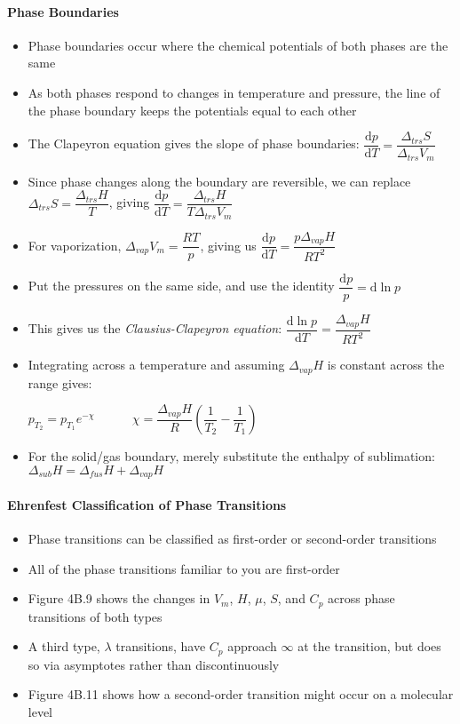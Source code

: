 \documentclass[12pt, openany, letterpaper]{memoir}
\begin{document}
\paragraph{Phase Boundaries}
\begin{itemize}
	\item Phase boundaries occur where the chemical potentials of both phases are the same
	\item As both phases respond to changes in temperature and pressure, the line of the phase boundary keeps the potentials equal to each other
	\item The Clapeyron equation gives the slope of phase boundaries: $\dfrac{\mathrm{d}p}{\mathrm{d}T}=\dfrac{\Delta_{trs}S}{\Delta_{trs}V_m}$
	\item Since phase changes along the boundary are reversible, we can replace $\Delta_{trs}S=\dfrac{\Delta_{trs}H}{T}$, giving $\dfrac{\mathrm{d}p}{\mathrm{d}T}= \dfrac{\Delta_{trs}H}{T\Delta_{trs}V_m}$
	\item For vaporization, $\Delta_{vap}V_m = \dfrac{RT}{p}$, giving us $\dfrac{\mathrm{d}p}{\mathrm{d}T}= \dfrac{p\Delta_{vap}H}{RT^2}$
	\item Put the pressures on the same side, and use the identity $\dfrac{\mathrm{d}p}{p}=\mathrm{d}\ln p$
	\item This gives us the \emph{Clausius-Clapeyron equation}: $\dfrac{\mathrm{d}\ln p}{\mathrm{d}T} =\dfrac{\Delta_{vap}H}{RT^2}$
	\item Integrating across a temperature and assuming $\Delta_{vap} H$ is constant across the range gives:

	      $p_{T_2} = p_{T_1}e^{-\chi} \hspace{3em} \chi = \dfrac{\Delta_{vap}H}{R}\left(\dfrac{1}{T_2}-\dfrac{1}{T_1}\right)$
	\item For the solid/gas boundary, merely substitute the enthalpy of sublimation: $\Delta_{sub}H = \Delta_{fus}H+\Delta_{vap}H$
\end{itemize}
\paragraph{Ehrenfest Classification of Phase Transitions}
\begin{itemize}
	\item Phase transitions can be classified as first-order or second-order transitions
	\item All of the phase transitions familiar to you are first-order
	\item Figure 4B.9 shows the changes in $V_m$, $H$, $\mu$, $S$, and $C_p$ across phase transitions of both types
	\item A third type, $\lambda$ transitions, have $C_p$ approach $\infty$ at the transition, but does so via asymptotes rather than discontinuously
	\item Figure 4B.11 shows how a second-order transition might occur on a molecular level
\end{itemize}
\end{document}
